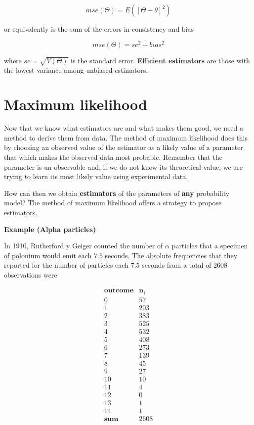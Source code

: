 \documentclass[
]{book}
\begin{document}
\[mse(\Theta)=E([\Theta - \theta]^2)\]

or equivalently is the sum of the errors in consistency and bias

\[mse(\Theta)=se^2 + bias^2\]

where \(se=\sqrt{V(\Theta)}\) is the standard error.
\textbf{Efficient estimators} are those with the lowest variance among unbiased estimators.

\hypertarget{maximum-likelihood-1}{%
\section{Maximum likelihood}\label{maximum-likelihood-1}}

Now that we know what estimators are and what makes them good, we need a method to derive them from data. The method of maximum likelihood does this by choosing an observed value of the estimator as a likely value of a parameter that which makes the observed data most probable. Remember that the parameter is un-observable and, if we do not know its theoretical value, we are trying to learn its most likely value using experimental data.

How can then we obtain \textbf{estimators} of the parameters of \textbf{any} probability model? The method of maximum likelihood offers a strategy to propose estimators.

\textbf{Example (Alpha particles)}

In 1910, Rutherford y Geiger counted the number of \(\alpha\) particles that a specimen of polonium would emit each \(7.5\) seconds. The absolute frequencies that they reported for the number of particles each \(7.5\) seconds from a total of \(2608\) observations were

\[
\begin{array}{cc}
\mathbf{outcome} & \mathbf{n_i}  \\
0 & 57 \\
1 & 203 \\
2 & 383 \\
3 & 525 \\
4 & 532 \\
5 & 408 \\
6 & 273 \\
7 & 139 \\
8 & 45 \\
9 & 27 \\
10 &  10 \\
11 &   4 \\
12 &   0 \\
13 &   1 \\
14 &   1 \\ \hline
\mathbf{sum} & 2608 \\
\end{array}
\]
\end{document}
